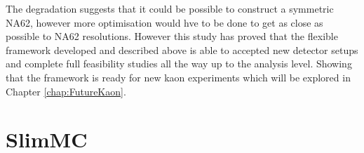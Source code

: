 \documentclass[../../main.tex]{subfiles}
\begin{document}
    The degradation suggests that it could be possible to construct a symmetric NA62, however more optimisation would hve to be done to get as close as possible to NA62 resolutions. However this study has proved that the flexible framework developed and described above is able to accepted new detector setups and complete full feasibility studies all the way up to the 
    analysis level. Showing that the framework is ready for new kaon experiments which will be explored in Chapter \ref{chap:FutureKaon}.

    \section{SlimMC}

    \ifSubfilesClassLoaded{%
        
    }{} 
\end{document}
